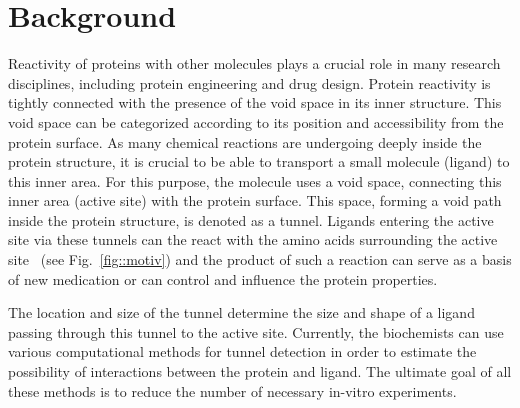 \documentclass{bmcart}
\begin{document}


\section*{Background}

Reactivity of proteins with other molecules plays a crucial role in many research disciplines, including protein engineering and drug design.
Protein reactivity is tightly connected with the presence of the void space in its inner structure.
This void space can be categorized according to its position and accessibility from the protein surface. 
As many chemical reactions are undergoing deeply inside the protein structure, it is crucial to be able to transport a small molecule (ligand) to this inner area.
For this purpose, the molecule uses a void space, connecting this inner area (active site) with the protein surface.
This space, forming a void path inside the protein structure, is denoted as a tunnel.
Ligands entering the active site via these tunnels can the react with the amino acids surrounding the active site~\cite{gora2013gates,marques2017enzyme} (see Fig.~\ref{fig::motiv}) and the product of such a reaction can serve as a basis of new medication or can control and influence the protein properties. 
 
The location and size of the tunnel determine the size and shape of a ligand passing through this tunnel to the active site.
Currently, the biochemists can use various computational methods for tunnel detection in order to estimate the possibility of interactions between the protein and ligand.
The ultimate goal of all these methods is to reduce the number of necessary in-vitro experiments.
\end{document}
